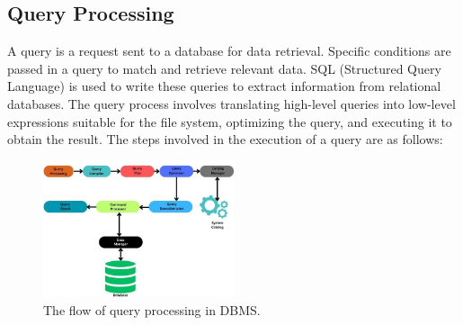\subsection{Query Processing }
A query is a request sent to a database for data retrieval. Specific conditions are passed in a query to match and retrieve relevant data. SQL (Structured Query Language) is used to write these queries to extract information from relational databases. The query process involves translating high-level queries into low-level expressions suitable for the file system, optimizing the query, and executing it to obtain the result. The steps involved in the execution of a query are as follows:\cite{wwwnaukricom-no-date}\\
\begin{figure}[h]
    \centering
    \includegraphics[width=0.5\textwidth]{Figure/Flow of QueryProcessing.jpg}
    \caption{The flow of query processing in DBMS.}
    \label{fig:my_image}
\end{figure}
